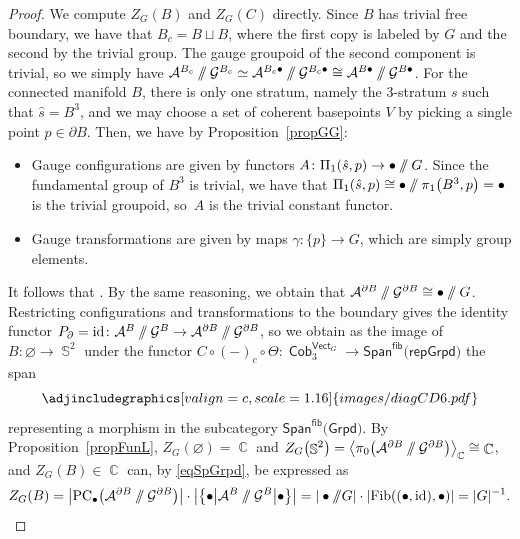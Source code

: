 \documentclass[pdftex]{sigma}
\DeclareMathOperator{\id}{id}
\DeclareMathOperator{\vect}{\mathsf{Vect}}
\DeclareMathOperator{\C}{\mathbb{C}}
\DeclareMathOperator{\Sp}{\mathbb{S}}
\DeclareMathOperator{\Cob}{\mathsf{Cob}}
\newcommand{\sslash}{\mathbin{/\mkern-6mu/}}
\numberwithin{equation}{section}
\theoremstyle{definition}
\begin{document}
\begin{proof}
 We compute $Z_G(B)$ and $Z_G(C)$ directly. Since $B$ has trivial free boundary, we have that $B_c = B \sqcup B$, where the first copy is labeled by $G$ and the second by the trivial group. The gauge groupoid of the second component is trivial, so we simply have $ \allowbreak \mathcal{A}^{B_c} \sslash \mathcal{G}^{B_c} \simeq \mathcal{A}^{{B_c} \bullet} \sslash \mathcal{G}^{{B_c} \bullet} \cong \mathcal{A}^{{B} \bullet} \sslash \mathcal{G}^{{B} \bullet}$. For the connected manifold $B$, there is only one stratum, namely the 3-stratum $s$ such that $\hat{s} = B^3$, and we may choose a set of coherent basepoints $V$ by picking a single point $p \in \partial B$. Then, we have by Proposition~\ref{propGG}:
 \begin{itemize}\itemsep=0pt
 \item Gauge configurations are given by functors $A\colon \Pi_1(\hat{s}, p) \rightarrow \bullet \sslash G$. Since the fundamental group of $B^3$ is trivial, we have that $\Pi_1(\hat{s}, p) \cong \bullet \sslash \pi_1\bigl(B^3, p\bigr) = \bullet$ is the trivial groupoid, so~$A$ is the trivial constant functor.
 \item Gauge transformations are given by maps $\gamma\colon \{p\} \rightarrow G$, which are simply group elements.
 \end{itemize}
 It follows that \smash{$\mathcal{A}^B \sslash \mathcal{G}^B \cong \bullet \sslash G$}. By the same reasoning, we obtain that ${\smash{\mathcal{A}^{\partial B} \sslash \mathcal{G}^{\partial B}} \cong \bullet \sslash G}$. Restricting configurations and transformations to the boundary gives the identity functor $P_{\partial} = \id\colon \smash{\mathcal{A}^B \sslash \mathcal{G}^B \rightarrow \mathcal{A}^{\partial B} \sslash \mathcal{G}^{\partial B}}$, so we obtain as the image of $B\colon \varnothing \rightarrow \Sp^2$ under the functor $C \circ (-)_c \circ \Theta\colon \Cob_3^{\vect_G} \rightarrow \mathsf{Span}^{\mathsf{fib}}(\mathsf{repGrpd)}$ the span
 \[
 \centering
 \adjincludegraphics[valign=c, scale = 1.16]{images/diagCD6.pdf}
 \]
 representing a morphism in the subcategory $\mathsf{Span}^{\mathsf{fib}}(\mathsf{Grpd)}$. By Proposition~\ref{propFunL}, $Z_G(\varnothing) = \C$ and $Z_G\bigl(\Sp^2\bigr) = \bigl\langle\pi_0\bigl(\mathcal{A}^{\partial B} \sslash \mathcal{G}^{\partial B}\bigr)\bigr\rangle_{\C} \cong \C$, and $Z_G(B) \in \C$ can, by \eqref{eqSpGrpd}, be expressed as
 \begin{align*}
 Z_G(B) = \bigl|\mathrm{PC}_{\bullet}\bigl(\mathcal{A}^{\partial B} \sslash \mathcal{G}^{\partial B}\bigr)\bigr| \cdot \bigl|\bigl\{\bullet \bigl| \mathcal{A}^{ B} \sslash \mathcal{G}^{ B} \bigr| \bullet\bigr\}\bigr| = |\bullet \sslash G| \cdot |\mathrm{Fib}((\bullet, \id), \bullet)| = |G|^{-1}.

\end{align*}
\end{proof}
\end{document}
